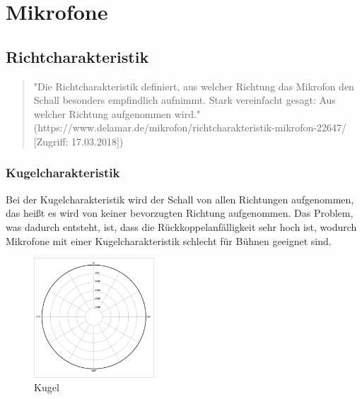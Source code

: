 \section{Mikrofone}
\subsection{Richtcharakteristik}
\begin{quote}
"Die Richtcharakteristik definiert, aus welcher Richtung das Mikrofon den Schall besonders empfindlich aufnimmt. Stark vereinfacht gesagt: Aus welcher Richtung aufgenommen wird." (https://www.delamar.de/mikrofon/richtcharakteristik-mikrofon-22647/ [Zugriff: 17.03.2018])
\end{quote}
\subsubsection{Kugelcharakteristik}
Bei der Kugelcharakteristik wird der Schall von allen Richtungen aufgenommen, das heißt es wird von keiner bevorzugten Richtung aufgenommen. Das Problem, was dadurch entsteht, ist, dass die Rückkoppelanfälligkeit sehr hoch ist, wodurch Mikrofone mit einer Kugelcharakteristik schlecht für Bühnen geeignet sind.\citep{kugel}
\begin{figure}[H]
	\centering
	\includegraphics[width=0.4\textwidth]{abb4} 
	\caption[Kugel]{Kugel\footnotemark}
\end{figure}
